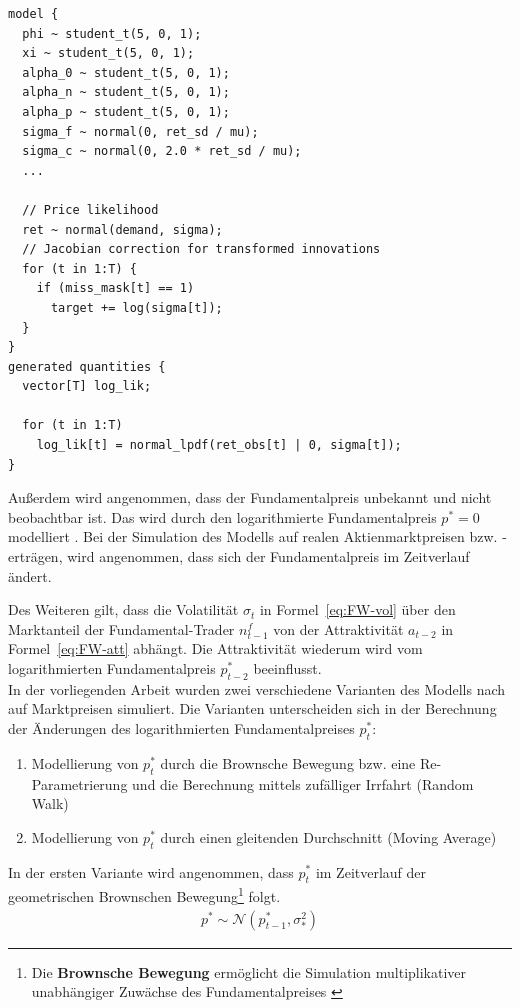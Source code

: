 \documentclass[ngerman]{ttlab-qualify}
\begin{document}
\begin{lstlisting}[style=custom]
model {
  phi ~ student_t(5, 0, 1);
  xi ~ student_t(5, 0, 1);
  alpha_0 ~ student_t(5, 0, 1);
  alpha_n ~ student_t(5, 0, 1);
  alpha_p ~ student_t(5, 0, 1);
  sigma_f ~ normal(0, ret_sd / mu);
  sigma_c ~ normal(0, 2.0 * ret_sd / mu);
  ...

  // Price likelihood
  ret ~ normal(demand, sigma);
  // Jacobian correction for transformed innovations
  for (t in 1:T) {
    if (miss_mask[t] == 1)
      target += log(sigma[t]);
  }
}
generated quantities {
  vector[T] log_lik;

  for (t in 1:T)
    log_lik[t] = normal_lpdf(ret_obs[t] | 0, sigma[t]);
}
\end{lstlisting}

Außerdem wird angenommen, dass der Fundamentalpreis unbekannt und nicht beobachtbar ist. Das wird durch den logarithmierte Fundamentalpreis $p^*=0$ modelliert \parencite{bertschinger:2018, FW:2011}. Bei der Simulation des Modells auf realen Aktienmarktpreisen bzw. -erträgen, wird angenommen, dass sich der Fundamentalpreis im Zeitverlauf ändert.

Des Weiteren gilt, dass die Volatilität $\sigma_t$ in Formel~\ref{eq:FW-vol} über den Marktanteil der Fundamental-Trader $n_{t-1}^f$ von der Attraktivität $a_{t-2}$ in Formel~\ref{eq:FW-att} abhängt. Die Attraktivität wiederum wird vom logarithmierten Fundamentalpreis $p_{t-2}^*$ beeinflusst. \\ 

In der vorliegenden Arbeit wurden zwei verschiedene Varianten des Modells nach \parencite{bertschinger:2018} auf Marktpreisen simuliert. Die Varianten unterscheiden sich in der Berechnung der Änderungen des logarithmierten Fundamentalpreises $p_t^*$:
\begin{enumerate}
\item Modellierung von $p_t^*$ durch die Brownsche Bewegung bzw. eine Re-Parametrierung und die Berechnung mittels zufälliger Irrfahrt (Random Walk)
\item Modellierung von $p_t^*$ durch einen gleitenden Durchschnitt (Moving Average)
\end{enumerate}
In der ersten Variante wird angenommen, dass $p_t^*$ im Zeitverlauf der geometrischen Brownschen Bewegung\footnote{Die \textbf{Brownsche Bewegung} ermöglicht die Simulation multiplikativer unabhängiger Zuwächse des Fundamentalpreises \parencite{BrownianMotion}} folgt.
\begin{align}
\label{eq:FW-p_star}
p^*\sim \mathcal{N}(p_{t-1}^*,\sigma_*^2)
\end{align}
\end{document}

